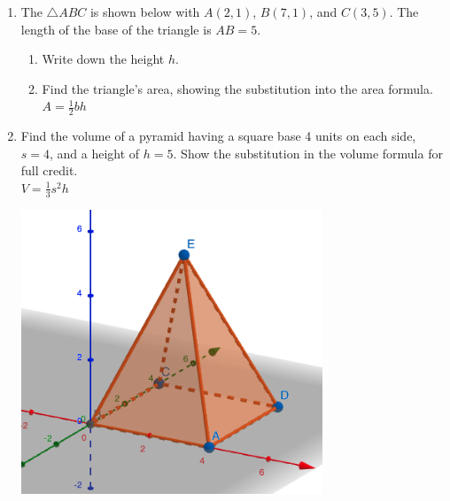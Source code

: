 \documentclass[12pt, twoside]{article}
\begin{document}
\begin{enumerate}
\newpage
\item The $\triangle ABC$ is shown below with $A(2,1)$, $B(7,1)$, and $C(3,5)$. The length of the base of the triangle is $AB=5$.
  \begin{multicols}{2}
    \begin{enumerate}
      \item Write down the height $h$.
      \item Find the triangle's area, showing the substitution into the area formula.\\[0.25cm]
      $A=\frac{1}{2}bh$ \vspace{2cm}
      \end{enumerate}
      \begin{flushright}
      \end{flushright}
  \end{multicols}

\newpage
\item Find the volume of a pyramid having a square base 4 units on each side, $s=4$, and a height of $h=5$. Show the substitution in the volume formula for full credit. \\[0.5cm]
$\displaystyle V = \frac{1}{3} s^2 h$
  \begin{flushright}
    \includegraphics[width=9cm]{6-17-4-pyramid.png}
  \end{flushright}


\end{enumerate}
\end{document}
